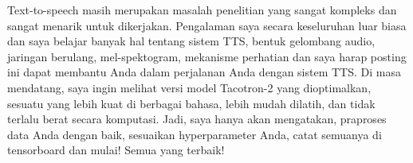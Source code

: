 Text-to-speech masih merupakan masalah penelitian yang sangat kompleks dan sangat menarik untuk dikerjakan. Pengalaman saya secara keseluruhan luar biasa dan saya belajar banyak hal tentang sistem TTS, bentuk gelombang audio, jaringan berulang, mel-spektogram, mekanisme perhatian dan saya harap posting ini dapat membantu Anda dalam perjalanan Anda dengan sistem TTS. Di masa mendatang, saya ingin melihat versi model Tacotron-2 yang dioptimalkan, sesuatu yang lebih kuat di berbagai bahasa, lebih mudah dilatih, dan tidak terlalu berat secara komputasi.
Jadi, saya hanya akan mengatakan, praproses data Anda dengan baik, sesuaikan hyperparameter Anda, catat semuanya di tensorboard dan mulai! Semua yang terbaik!